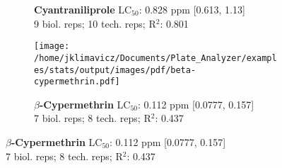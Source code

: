 \documentclass{article}
\begin{document}
\begin{figure}[thp!]
\begin{subfigure}{0.500\textwidth}
      \vspace{-0.05cm}
      \caption*{\textbf{Cyantraniliprole} LC$_{50}$: 0.828 ppm [0.613, 1.13] \\ 
9 biol. reps; 10 tech. reps; R$^2$: 0.801}
      \vspace{0.1cm}
   \end{subfigure}%
   \begin{subfigure}{0.500\textwidth}
      \centering
      \texttt{[image: /home/jklimavicz/Documents/Plate\_Analyzer/examples/stats/output/images/pdf/beta-cypermethrin.pdf]}
      \vspace{-0.05cm}
      \caption*{\textbf{$\beta$-Cypermethrin} LC$_{50}$: 0.112 ppm [0.0777, 0.157] \\ 
7 biol. reps; 8 tech. reps; R$^2$: 0.437}
      \vspace{0.1cm}
   \end{subfigure}%
\end{figure}
\clearpage
\pagebreak
\vspace{-0.1cm}
\end{document}

